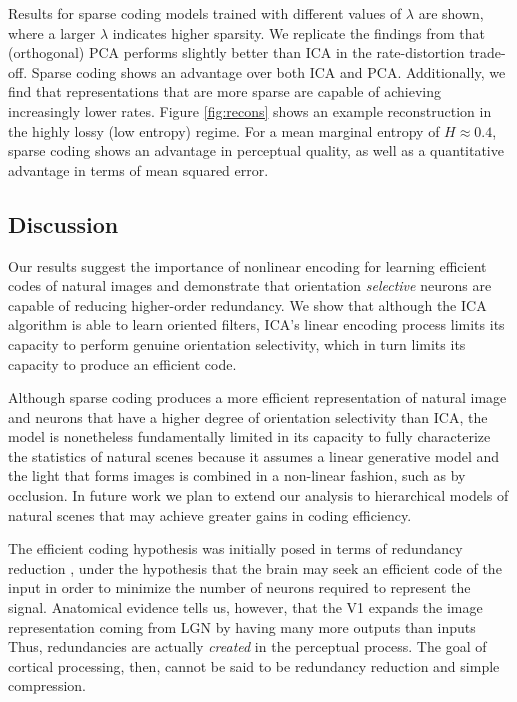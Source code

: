 Results for sparse coding models trained with different values of $\lambda$ are shown, where a larger $\lambda$ indicates higher sparsity. We replicate the findings from  that (orthogonal) PCA  performs slightly better than ICA in the rate-distortion trade-off. Sparse coding shows an advantage over both ICA and PCA. Additionally, we find that representations that are more sparse are capable of achieving increasingly lower rates.
Figure \ref{fig:recons} shows an example reconstruction in the highly lossy (low entropy) regime. For a mean marginal entropy of $H\approx 0.4$, sparse coding shows an advantage in perceptual quality, as well as a quantitative advantage in terms of mean squared error.


\subsection{Discussion}
Our results suggest the importance of nonlinear encoding for learning efficient codes of natural images and demonstrate that orientation \textit{selective} neurons are capable of reducing higher-order redundancy. We show that although the ICA algorithm is able to learn oriented filters, ICA's linear encoding process limits its capacity to perform genuine orientation selectivity, which in turn limits its capacity to produce an efficient code. 

Although sparse coding produces a more efficient representation of natural image and neurons that have a higher degree of orientation selectivity than ICA, the model is nonetheless fundamentally limited in its capacity to fully characterize the statistics of natural scenes because it assumes a linear generative model and the light that forms images is combined in a non-linear fashion, such as by occlusion. In future work we plan to extend our analysis to hierarchical models of natural scenes that may achieve greater gains in coding efficiency.

The efficient coding hypothesis was initially posed in terms of redundancy reduction \cite{barlow1961possible}, under the hypothesis that the brain may seek an efficient code of the input in order to minimize the number of neurons required to represent the signal. Anatomical evidence tells us, however, that the V1 expands the image representation coming from LGN by having many more outputs than inputs \cite{olshausen2003principles} Thus, redundancies are actually \textit{created} in the perceptual process. The goal of cortical processing, then, cannot be said to be redundancy reduction and simple compression.

